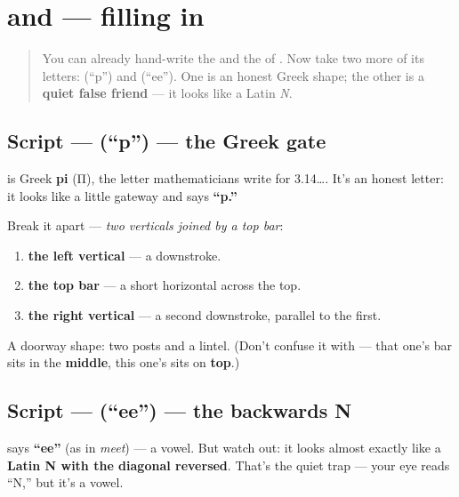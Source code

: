 \section[\texorpdfstring{\ru{п}, \ru{и} (p, i)}{п, и (p, i)}]{ and  — filling in }

\label{lesson:RU-W04-privet-letters-p-i}



\begin{quote}
You can already hand-write the \emph{} and the \emph{} of \emph{}. Now take two more of its letters: \textbf{} (\textquotedblleft{}p\textquotedblright{}) and \textbf{} (\textquotedblleft{}ee\textquotedblright{}). One is an honest Greek shape; the other is a \textbf{quiet false friend} — it looks like a Latin \emph{N}.
\end{quote}

\subsection*{Script —  (\textquotedblleft{}p\textquotedblright{}) — the Greek gate}

\textbf{} is Greek \textbf{pi} (Π), the letter mathematicians write for 3.14…. It's an honest letter: it looks like a little gateway and says \textbf{\textquotedblleft{}p.\textquotedblright{}}

Break it apart — \emph{two verticals joined by a top bar}:

\begin{enumerate}
\raggedright
  \item \textbf{the left vertical} — a downstroke.
  \item \textbf{the top bar} — a short horizontal across the top.
  \item \textbf{the right vertical} — a second downstroke, parallel to the first.
\end{enumerate}

A doorway shape: two posts and a lintel. (Don't confuse it with \textbf{} — that one's bar sits in the \textbf{middle}, this one's sits on \textbf{top}.)

\subsection*{Script —  (\textquotedblleft{}ee\textquotedblright{}) — the backwards N}
\textbf{} says \textbf{\textquotedblleft{}ee\textquotedblright{}} (as in \emph{meet}) — a vowel. But watch out: it looks almost exactly like a \textbf{Latin N with the diagonal reversed}. That's the quiet trap — your eye reads \textquotedblleft{}N,\textquotedblright{} but it's a vowel.


